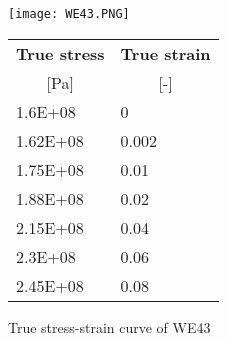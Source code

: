 \begin{figure}
\begin{minipage}[t]{0.59\textwidth}
    \centering
    \texttt{[image: WE43.PNG]}
\end{minipage}
\begin{minipage}[t]{0.4\textwidth}
\vspace{-50mm}
\begin{tabular}{|l|l|}
\hline
\textbf{True stress} & \textbf{True strain} \\
\multicolumn{1}{|c|}{{[}Pa{]}} & \multicolumn{1}{c|}{{[}-{]}} \\\hline
1.6E+08                       & 0                            \\ \hline
1.62E+08                      & 0.002                        \\ \hline
1.75E+08                      & 0.01                         \\ \hline
1.88E+08                      & 0.02                         \\ \hline
2.15E+08                      & 0.04                         \\ \hline
2.3E+08                       & 0.06                         \\ \hline
2.45E+08                      & 0.08                         \\ \hline
\end{tabular}
\end{minipage}
\caption{True stress-strain curve of WE43 \cite{WE43}}
\label{fig:WE43}
\end{figure}

